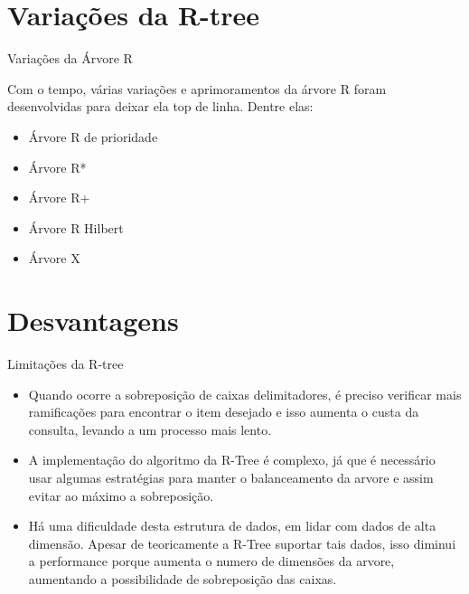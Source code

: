 \documentclass[compress,aspectratio=169]{beamer}
\begin{document}
\section{Variações da R-tree}
\begin{frame}{Variações da Árvore R}
\begin{justify}
    \par Com o tempo, várias variações e aprimoramentos da árvore R foram desenvolvidas para deixar ela top de linha. Dentre elas:
    \begin{itemize}
        \item Árvore R de prioridade
        \item Árvore R*
        \item Árvore R+
        \item Árvore R Hilbert
        \item Árvore X
    \end{itemize}
    \end{justify}

\end{frame}

\section{Desvantagens}
\begin{frame}{Limitações da R-tree}
    
    \begin{justify}
        \begin{itemize}
            \item Quando ocorre a sobreposição de caixas delimitadores, é preciso verificar mais ramificações para encontrar o item desejado e isso aumenta o custa da consulta, levando a um processo mais lento.
            \item A implementação do algoritmo da R-Tree é complexo, já que é necessário usar algumas estratégias para manter o balanceamento da arvore e assim evitar ao máximo a sobreposição.
            \item Há uma dificuldade desta estrutura de dados, em lidar com dados de alta dimensão. Apesar de teoricamente a R-Tree suportar tais dados, isso diminui a performance porque aumenta o numero de dimensões da arvore, aumentando a possibilidade de sobreposição das caixas.
        \end{itemize}
    \end{justify}
\end{frame}
\end{document}
